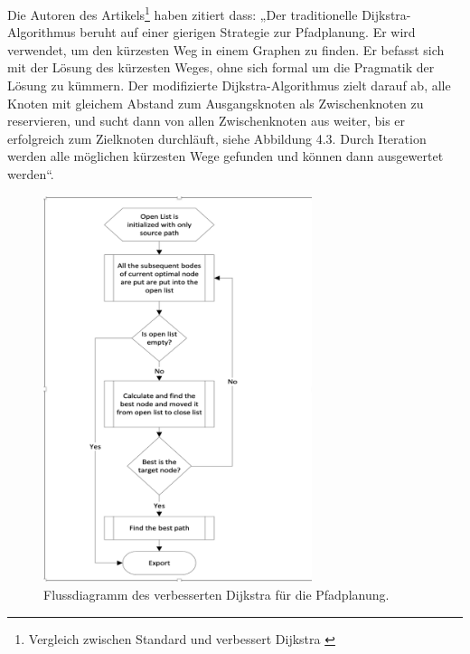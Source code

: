 Die Autoren des Artikels\footnote{Vergleich zwischen Standard und verbessert Dijkstra \cite{Karur2021}} haben zitiert dass:
„Der traditionelle Dijkstra-Algorithmus beruht auf einer gierigen Strategie zur Pfadplanung. Er wird verwendet, um den kürzesten Weg in einem Graphen zu finden. Er befasst sich mit der Lösung des kürzesten Weges, ohne sich formal um die Pragmatik der Lösung zu kümmern.
\newline
\newline
 Der modifizierte Dijkstra-Algorithmus zielt darauf ab, alle Knoten mit gleichem Abstand zum Ausgangsknoten als Zwischenknoten zu reservieren, und sucht dann von allen Zwischenknoten aus weiter, bis er erfolgreich zum Zielknoten durchläuft, siehe Abbildung 4.3. Durch Iteration werden alle möglichen kürzesten Wege gefunden und können dann ausgewertet werden“.

\begin{figure}[H]
	\centering
	\includegraphics[width=0.7\textwidth]{images/Activity_robot.PNG}
	\caption{\label{fig:Robot}Flussdiagramm des verbesserten Dijkstra für die Pfadplanung\cite{Karur2021}.}
\end{figure}

